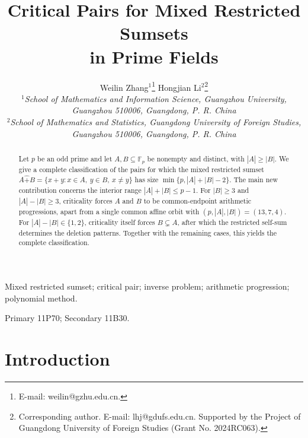 \documentclass[12pt]{article}
\theoremstyle{remark}
\newcommand{\F}{\mathbb{F}_p}
\newcommand{\rs}{\mathbin{\widehat+}}
\begin{document}
\title{Critical Pairs for Mixed Restricted Sumsets\\ in Prime Fields}
\author{
Weilin Zhang$^{1}$\footnote{E-mail: weilin@gzhu.edu.cn.}\quad
Hongjian Li$^{2}$\footnote{Corresponding author. E-mail: lhj@gdufs.edu.cn. Supported by the Project of Guangdong University of Foreign Studies (Grant No. 2024RC063).}\\
{\small\itshape $^{1}$School of Mathematics and Information Science, Guangzhou University,}\\
{\small\itshape Guangzhou 510006, Guangdong, P. R. China}\\
{\small\itshape $^{2}$School of Mathematics and Statistics, Guangdong University of Foreign Studies,}\\
{\small\itshape Guangzhou 510006, Guangdong, P. R. China}
}



\date{}
\maketitle

\begin{abstract}
Let $p$ be an odd prime and let $A,B\subseteq\F$ be nonempty and distinct,
with $|A|\ge |B|$.  We give a complete classification of the pairs for
which the mixed restricted sumset
$A\rs B=\{x+y:x\in A,\ y\in B,\ x\ne y\}$ has size
$\min\{p,|A|+|B|-2\}$.  The main new contribution concerns the interior range $|A|+|B|\le p-1$.
For $|B|\ge3$ and $|A|-|B|\ge3$, criticality forces $A$ and $B$ to be common-endpoint arithmetic progressions, apart from a single common affine orbit with $(p,|A|,|B|)=(13,7,4)$.
For $|A|-|B|\in\{1,2\}$, criticality itself forces $B\subsetneq A$, after which
the restricted self-sum determines the deletion patterns. Together with the remaining cases, this yields the complete classification.
\end{abstract}

\medskip
{} Mixed restricted sumset; critical pair; inverse problem; arithmetic progression; polynomial method.
\medskip

 Primary 11P70; Secondary 11B30.




\section{Introduction}\label{intro}
\end{document}

